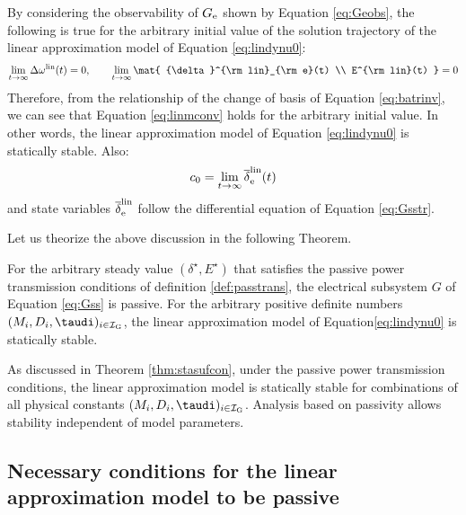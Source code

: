 \documentclass[graybox, envcountchap]{svmult}
\begin{document}
By considering the observability of $G_{\rm e}$ shown by Equation \ref{eq:Geobs},
the following is true for the arbitrary initial value of the solution trajectory of the linear approximation model of Equation \ref{eq:lindynu0}:
\begin{align}\label{eq:allzero}
\lim_{t\rightarrow \infty} \Delta \omega^{\rm lin}(t)  =0,\qquad
\lim_{t\rightarrow \infty} \mat{
{\delta}^{\rm lin}_{\rm e}(t)   \\
E^{\rm lin}(t)  
}
 =0
\end{align}
Therefore, from the relationship of the change of basis of Equation \ref{eq:batrinv}, we can see that Equation \ref{eq:linmconv} holds for the arbitrary initial value.
In other words, the linear approximation model of Equation \ref{eq:lindynu0} is statically stable.
Also:
\[
c_0 = \lim_{t\rightarrow \infty}\overline{\delta}^{\rm lin}_{\rm e}(t)
\]
and state variables $\overline{\delta}^{\rm lin}_{\rm e}$ follow the differential equation of Equation \ref{eq:Gsstr}.

Let us theorize the above discussion in the following Theorem.

\begin{定理}\label{thm:stasufcon}
For the arbitrary steady value $(\delta^{\star},E^{\star})$ that satisfies the passive power transmission conditions of definition \ref{def:passtrans}, the electrical subsystem $G$ of Equation \ref{eq:Gss} is passive.
For the arbitrary positive definite numbers $(M_i,D_i,\taudi )_{i \in \mathcal{I}_{\rm G}}$, the linear approximation model of Equation\ref{eq:lindynu0} is statically stable.
\end{定理}

As discussed in Theorem \ref{thm:stasufcon}, under the passive power transmission conditions, the linear approximation model is statically stable for combinations of all physical constants $(M_i,D_i,\taudi )_{i \in \mathcal{I}_{\rm G}}$.
Analysis based on passivity allows stability independent of model parameters.



\subsection{Necessary conditions for the linear approximation model to be passive\advanced}\label{sec:nesconana}
\end{document}
